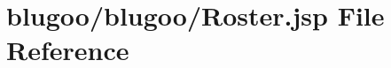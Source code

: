 \hypertarget{Roster_8jsp}{
\section{blugoo/blugoo/Roster.jsp File Reference}
\label{Roster_8jsp}
}


